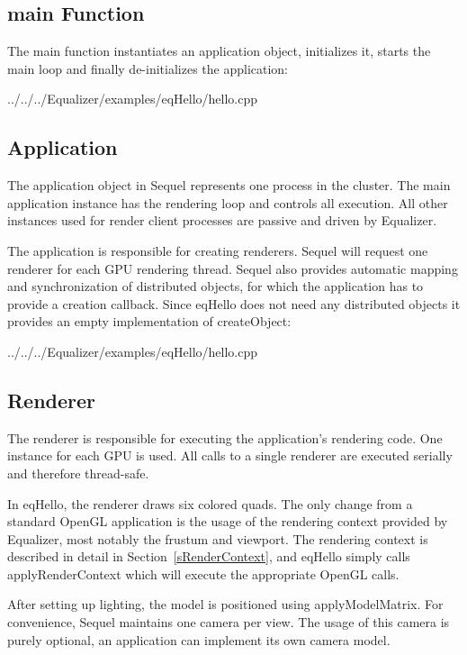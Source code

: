 \documentclass[10pt,a4]{scrartcl}
\newcommand{\sref}[1]{Section~\ref{#1}}
\begin{document}
\subsection{main Function}

The main function instantiates an application object, initializes it, starts the
main loop and finally de-initializes the application:

{\footnotesize
  {../../../Equalizer/examples/eqHello/hello.cpp}}

\subsection{Application}

The application object in Sequel represents one process in the cluster. The main
application instance has the rendering loop and controls all execution. All
other instances used for render client processes are passive and driven by
Equalizer.

The application is responsible for creating renderers. Sequel will request one
renderer for each GPU rendering thread. Sequel also provides automatic mapping
and synchronization of distributed objects, for which the application has to
provide a creation callback. Since \textsf{eqHello} does not need any
distributed objects it provides an empty implementation of
\textsf{createObject}:

{\footnotesize
  {../../../Equalizer/examples/eqHello/hello.cpp}}

\subsection{Renderer}

The renderer is responsible for executing the application's rendering code. One
instance for each GPU is used. All calls to a single renderer are executed
serially and therefore thread-safe.

In \textsf{eqHello}, the renderer draws six colored quads. The only change from
a standard OpenGL application is the usage of the rendering context provided by
Equalizer, most notably the frustum and viewport. The rendering context is
described in detail in \sref{sRenderContext}, and \textsf{eqHello} simply calls
\textsf{applyRenderContext} which will execute the appropriate OpenGL calls.

After setting up lighting, the model is positioned using
\textsf{applyModelMatrix}. For convenience, Sequel maintains one camera per
view. The usage of this camera is purely optional, an application can implement
its own camera model.
\end{document}
